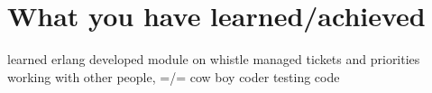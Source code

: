 \chapter{What you have learned/achieved}
\label{ch:learned}
learned erlang
developed module on whistle
managed tickets and priorities
working with other people, =/= cow boy coder
testing code